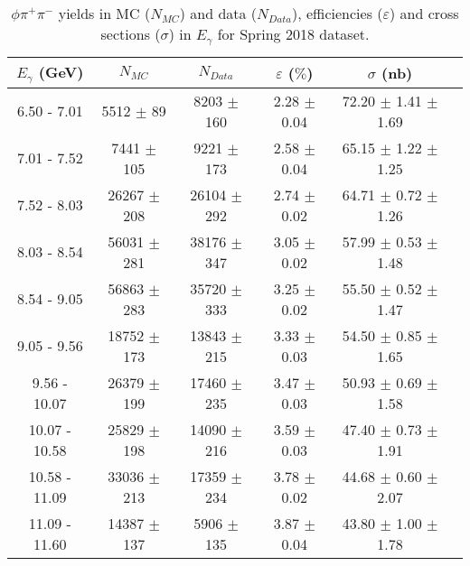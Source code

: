 \begin{center}
\begin{table}[H]
    \caption{$\phi \pi^{+}\pi^{-}$ yields in MC ($N_{MC}$) and data ($N_{Data}$), efficiencies ($\varepsilon$) and cross sections ($\sigma$) in $E_{\gamma}$ for Spring 2018 dataset.}
    \label{tab.y2175.xsec_ul.phi2pi.3.1}
    \begin{tabular}{|c|c|c|c|c|c|}
    \hline
    $E_{\gamma}$ (GeV) & $N_{MC}$ & $N_{Data}$ & $\varepsilon$ ($\%$) & $\sigma$ (nb) \\ 
    \hline
    6.50 - 7.01 & 5512 $\pm$ 89 & 8203 $\pm$ 160 & 2.28 $\pm$ 0.04 & 72.20 $\pm$ 1.41 $\pm$ 1.69 \\ 
    7.01 - 7.52 & 7441 $\pm$ 105 & 9221 $\pm$ 173 & 2.58 $\pm$ 0.04 & 65.15 $\pm$ 1.22 $\pm$ 1.25 \\ 
    7.52 - 8.03 & 26267 $\pm$ 208 & 26104 $\pm$ 292 & 2.74 $\pm$ 0.02 & 64.71 $\pm$ 0.72 $\pm$ 1.26 \\ 
    8.03 - 8.54 & 56031 $\pm$ 281 & 38176 $\pm$ 347 & 3.05 $\pm$ 0.02 & 57.99 $\pm$ 0.53 $\pm$ 1.48 \\ 
    8.54 - 9.05 & 56863 $\pm$ 283 & 35720 $\pm$ 333 & 3.25 $\pm$ 0.02 & 55.50 $\pm$ 0.52 $\pm$ 1.47 \\ 
    9.05 - 9.56 & 18752 $\pm$ 173 & 13843 $\pm$ 215 & 3.33 $\pm$ 0.03 & 54.50 $\pm$ 0.85 $\pm$ 1.65 \\ 
    9.56 - 10.07 & 26379 $\pm$ 199 & 17460 $\pm$ 235 & 3.47 $\pm$ 0.03 & 50.93 $\pm$ 0.69 $\pm$ 1.58 \\ 
    10.07 - 10.58 & 25829 $\pm$ 198 & 14090 $\pm$ 216 & 3.59 $\pm$ 0.03 & 47.40 $\pm$ 0.73 $\pm$ 1.91 \\ 
    10.58 - 11.09 & 33036 $\pm$ 213 & 17359 $\pm$ 234 & 3.78 $\pm$ 0.02 & 44.68 $\pm$ 0.60 $\pm$ 2.07 \\ 
    11.09 - 11.60 & 14387 $\pm$ 137 & 5906 $\pm$ 135 & 3.87 $\pm$ 0.04 & 43.80 $\pm$ 1.00 $\pm$ 1.78 \\
   \hline
\end{tabular}
\end{table}
\end{center}

